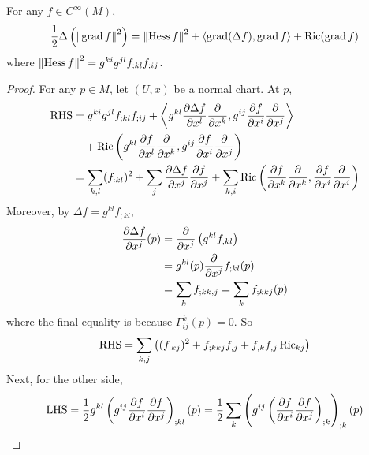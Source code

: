 \begin{enumerate}[label=\arabic{*}.]
	\begin{thm}\label{thm:bochner}
		For any $f \in C^\infty(M)$,
		\begin{equation*}
			\frac{1}{2}\Delta\left(\left\lVert\operatorname{grad}f\right\lVert^2\right) = \left\lVert\operatorname{Hess}f\right\lVert^2 + \left\langle \operatorname{grad}(\Delta f),\operatorname{grad} f \right\rangle + \operatorname{Ric}(\operatorname{grad}f)
		\end{equation*}
		where $\left\lVert\operatorname{Hess}f\right\lVert^2 = g^{ki}g^{jl}f_{;kl}f_{;ij}$.
	\end{thm}
	\begin{proof}
		For any $p \in M$, let $(U,x)$ be a normal chart. At $p$,
		\begin{equation*}
			\begin{aligned}
				\text{RHS} &=  g^{ki}g^{jl}f_{;kl}f_{;ij} + \left\langle g^{kl}\frac{\partial \Delta f}{\partial x^l}\frac{\partial}{\partial x^k}, g^{ij}\frac{\partial f}{\partial x^i}\frac{\partial}{\partial x^j} \right\rangle\\
				&\quad + \operatorname{Ric}\left(g^{kl}\frac{\partial f}{\partial x^l}\frac{\partial}{\partial x^k}, g^{ij}\frac{\partial f}{\partial x^i}\frac{\partial}{\partial x^j}\right) \\
				&= \sum_{k,l}(f_{:kl})^2 + \sum_j \frac{\partial \Delta f}{\partial x^j}\frac{\partial f}{\partial x^j} + \sum_{k,i}\operatorname{Ric}\left(\frac{\partial f}{\partial x^k}\frac{\partial}{\partial x^k},\frac{\partial f}{\partial x^i}\frac{\partial}{\partial x^i}\right)
			\end{aligned}
		\end{equation*}
		Moreover, by $\Delta f = g^{kl}f_{;kl}$,
		\begin{equation*}
			\begin{aligned}
				\frac{\partial \Delta f}{\partial x^j}(p) &= \frac{\partial}{\partial x^j} \left(g^{kl}f_{;kl}\right) \\
				&= g^{kl}(p)\frac{\partial}{\partial x^j}f_{;kl}(p) \\
				&= \sum_kf_{;kk,j} = \sum_kf_{;kkj}(p)
			\end{aligned}
		\end{equation*}
		where the final equality is because $\Gamma^k_{ij}(p) = 0$. So
		\begin{equation*}
			\text{RHS} = \sum_{k,j}\left((f_{:kj})^2+f_{;kkj}f_{,j}+f_{,k}f_{,j}\operatorname{Ric}_{kj}\right)
		\end{equation*}
		Next, for the other side,
		\begin{equation*}
			\begin{aligned}
				\text{LHS} &= \frac{1}{2}g^{kl}\bc{g^{ij}\frac{\partial f}{\partial x^i}\frac{\partial f}{\partial x^j}}_{;kl}(p) = \frac{1}{2}\sum_k\bc{g^{ij}\bc{\frac{\partial f}{\partial x^i}\frac{\partial f}{\partial x^j}}_{;k}}_{;k}(p) \\

\end{aligned}
\end{equation*}
\end{proof}
\end{enumerate}
